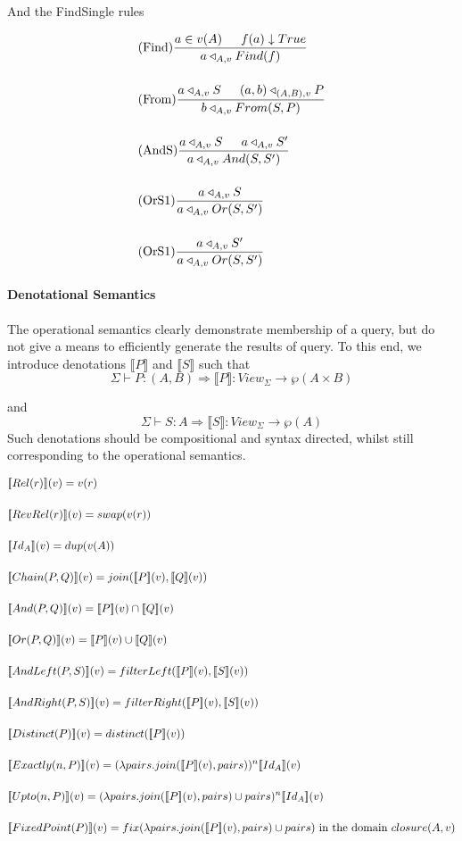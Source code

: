 \documentclass[12pt,a4paper,twoside,openright]{report}
\newcommand{\db}[1]{{\bf [\![}#1{\bf ]\!]}}
\newcommand{\deno}[1]{\db{#1}(v)}
\newcommand{\clos}[0]{closure(A, v)}
\newcommand{\opRule}[3]{#1 \triangleleft_{#2, v} #3}
\begin{document}
And the FindSingle rules

\begin{align}
&\displaystyle\mbox{(Find)}\frac{a \in v(A) \indent f(a)\downarrow True}{\opRule{a}{A}{Find(f)}} \\[3ex]
&\displaystyle\mbox{(From)}\frac{\opRule{a}{A}{S} \indent \opRule{(a,b)}{(A, B)}{P}}{\opRule{b}{A}{From(S, P)}} \\[3ex]
&\displaystyle\mbox{(AndS)}\frac{\opRule{a}{A}{S} \indent \opRule{a}{A}{S'}}{\opRule{a}{A}{And(S, S')}} \\[3ex]
&\displaystyle\mbox{(OrS1)}\frac{\opRule{a}{A}{S}}{\opRule{a}{A}{Or(S, S')}} \\[3ex]
&\displaystyle\mbox{(OrS1)}\frac{\opRule{a}{A}{S'}}{\opRule{a}{A}{Or(S, S')}}
\end{align}
\paragraph{Denotational Semantics}
The operational semantics clearly demonstrate membership of a query, but do not give a means to efficiently generate the results of query. To this end, we introduce denotations $\llbracket P \rrbracket$ and $\llbracket S \rrbracket$ such that \[\Sigma \vdash P \colon (A, B) \Rightarrow\llbracket P \rrbracket \colon View_{\Sigma} \rightarrow \wp(A \times B)\]

and \[\Sigma \vdash S \colon A \Rightarrow\llbracket S \rrbracket \colon View_{\Sigma} \rightarrow \wp(A)\] Such denotations should be compositional and syntax directed, whilst still corresponding to the operational semantics.

\begin{align}
& \deno{Rel(r)} = v(r) \\[3ex]
& \deno{RevRel(r)} = swap(v(r)) \\[3ex]
& \deno{Id_A} = dup(v(A)) \\[3ex]
& \deno{Chain(P, Q)} = join(\deno{P}, \deno{Q}) \\[3ex]
& \deno{And(P, Q)} = \deno{P} \cap \deno{Q} \\[3ex]
& \deno{Or(P, Q)} = \deno{P} \cup \deno{Q} \\[3ex]
& \deno{AndLeft(P, S)} = filterLeft(\deno{P}, \deno{S}) \\[3ex]
& \deno{AndRight(P, S)} = filterRight(\deno{P}, \deno{S}) \\[3ex]
& \deno{Distinct(P)} = distinct(\deno{P}) \\[3ex]
& \deno{Exactly(n, P)} = (\lambda pairs. join(\deno{P}, pairs))^n \deno{Id_A} \\[3ex]
& \deno{Upto(n, P)} = (\lambda pairs. join(\deno{P}, pairs) \cup pairs)^n \deno{Id_A} \\[3ex]
& \deno{FixedPoint(P)} = fix (\lambda pairs. join(\deno{P}, pairs) \cup pairs)  \mbox{ in the domain $\clos$}
\end{align}
\end{document}
